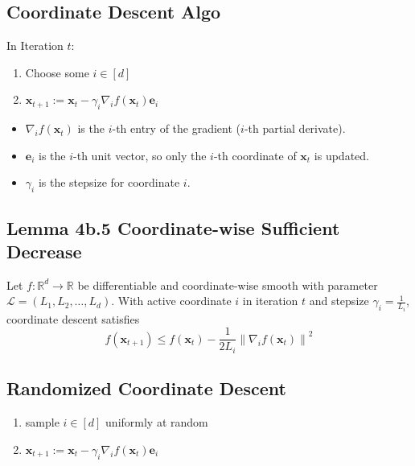 \subsection*{Coordinate Descent Algo}
In Iteration $t$:
\begin{enumerate}[label = (\roman*), leftmargin=*]
    \item Choose some $i \in[d]$
    \item $
\mathbf{x}_{t+1}:=\mathbf{x}_{t}-\gamma_{i} \nabla_{i} f\left(\mathbf{x}_{t}\right) \mathbf{e}_{i}
$
\end{enumerate}

\begin{itemize}[leftmargin=*]
    \item $\nabla_{i} f\left(\mathbf{x}_{t}\right)$ is the $i$-th entry of the gradient ($i$-th partial derivate).
    \item $ \mathbf{e}_{i}$ is the $i$-th unit vector, so only the $i$-th coordinate of $\mathbf{x}_{t}$ is updated.
    \item $\gamma_{i}$ is the stepsize for coordinate $i$.
\end{itemize}




\subsection*{Lemma 4b.5 Coordinate-wise Sufficient Decrease}
Let $f: \mathbb{R}^{d} \rightarrow \mathbb{R}$ be differentiable and coordinate-wise smooth with parameter $\mathcal{L}=\left(L_{1}, L_{2}, \ldots, L_{d}\right)$. With active coordinate $i$ in iteration $t$ and stepsize $\gamma_{i}=\frac{1}{L_{i}}$, coordinate descent satisfies
$$
f\left(\mathbf{x}_{t+1}\right) \leq f\left(\mathbf{x}_{t}\right)-\frac{1}{2 L_{i}}\left\|\nabla_{i} f\left(\mathbf{x}_{t}\right)\right\|^{2}
$$



\subsection*{Randomized Coordinate Descent}
\begin{enumerate}[label = (\roman*), leftmargin=*]
    \item sample $i \in[d]$ uniformly at random
    \item $
\mathbf{x}_{t+1}:=\mathbf{x}_{t}-\gamma_{i} \nabla_{i} f\left(\mathbf{x}_{t}\right) \mathbf{e}_{i}
$
\end{enumerate}

